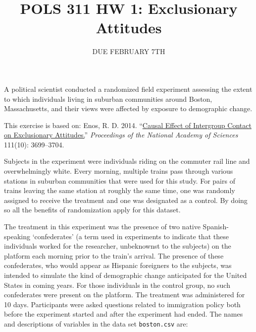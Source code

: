 \documentclass[]{article}
\title{POLS 311 HW 1: Exclusionary Attitudes}
\author{}
\date{DUE FEBRUARY 7TH}
\begin{document}
\maketitle

A political scientist conducted a randomized field experiment assessing
the extent to which individuals living in suburban communities around
Boston, Massachusetts, and their views were affected by exposure to
demographic change.

This exercise is based on: Enos, R. D. 2014.
``\href{http://dx.doi.org/10.1073/pnas.1317670111}{Causal Effect of
Intergroup Contact on Exclusionary Attitudes.}'' \emph{Proceedings of
the National Academy of Sciences} 111(10): 3699--3704.

Subjects in the experiment were individuals riding on the commuter rail
line and overwhelmingly white. Every morning, multiple trains pass
through various stations in suburban communities that were used for this
study. For pairs of trains leaving the same station at roughly the same
time, one was randomly assigned to receive the treatment and one was
designated as a control. By doing so all the benefits of randomization
apply for this dataset.

The treatment in this experiment was the presence of two native
Spanish-speaking `confederates' (a term used in experiments to indicate
that these individuals worked for the researcher, unbeknownst to the
subjects) on the platform each morning prior to the train's arrival. The
presence of these confederates, who would appear as Hispanic foreigners
to the subjects, was intended to simulate the kind of demographic change
anticipated for the United States in coming years. For those individuals
in the control group, no such confederates were present on the platform.
The treatment was administered for 10 days. Participants were asked
questions related to immigration policy both before the experiment
started and after the experiment had ended. The names and descriptions
of variables in the data set \texttt{boston.csv} are:
\end{document}
